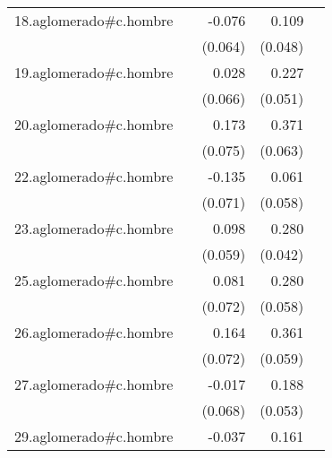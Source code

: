 {\begin{longtable}{l*{4}{D{.}{.}{-1}}}
\addlinespace
18.aglomerado#c.hombre&                     &      -0.076         &       0.109\sym{*}  &                     \\
            &                     &     (0.064)         &     (0.048)         &                     \\
\addlinespace
19.aglomerado#c.hombre&                     &       0.028         &       0.227\sym{***}&                     \\
            &                     &     (0.066)         &     (0.051)         &                     \\
\addlinespace
20.aglomerado#c.hombre&                     &       0.173\sym{*}  &       0.371\sym{***}&                     \\
            &                     &     (0.075)         &     (0.063)         &                     \\
\addlinespace
22.aglomerado#c.hombre&                     &      -0.135         &       0.061         &                     \\
            &                     &     (0.071)         &     (0.058)         &                     \\
\addlinespace
23.aglomerado#c.hombre&                     &       0.098         &       0.280\sym{***}&                     \\
            &                     &     (0.059)         &     (0.042)         &                     \\
\addlinespace
25.aglomerado#c.hombre&                     &       0.081         &       0.280\sym{***}&                     \\
            &                     &     (0.072)         &     (0.058)         &                     \\
\addlinespace
26.aglomerado#c.hombre&                     &       0.164\sym{*}  &       0.361\sym{***}&                     \\
            &                     &     (0.072)         &     (0.059)         &                     \\
\addlinespace
27.aglomerado#c.hombre&                     &      -0.017         &       0.188\sym{***}&                     \\
            &                     &     (0.068)         &     (0.053)         &                     \\
\addlinespace
29.aglomerado#c.hombre&                     &      -0.037         &       0.161\sym{***}&                     \\

\end{longtable}}
